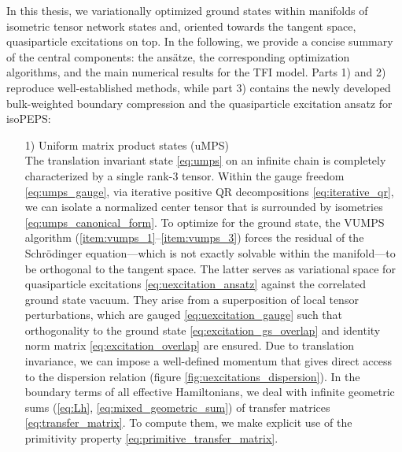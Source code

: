 In this thesis, we variationally optimized ground states within manifolds of isometric tensor network states and, oriented towards the tangent space, quasiparticle excitations on top. In the following, we provide a concise summary of the central components: the ansätze, the corresponding optimization algorithms, and the main numerical results for the TFI model. Parts 1) and 2) reproduce well-established methods, while part 3) contains the newly developed bulk-weighted boundary compression and the quasiparticle excitation ansatz for isoPEPS:
\begin{enumerate}
	\item[1)] Uniform matrix product states (uMPS) \\[0.3em]
	The translation invariant state \eqref{eq:umps} on an infinite chain is completely characterized by a single rank-3 tensor. Within the gauge freedom \eqref{eq:umps_gauge}, via iterative positive QR decompositions \eqref{eq:iterative_qr}, we can isolate a normalized center tensor that is surrounded by isometries \eqref{eq:umps_canonical_form}. To optimize for the ground state, the VUMPS algorithm (\ref{item:vumps_1}--\ref{item:vumps_3}) forces the residual of the Schrödinger equation---which is not exactly solvable within the manifold---to be orthogonal to the tangent space. The latter serves as variational space for quasiparticle excitations \eqref{eq:uexcitation_ansatz} against the correlated ground state vacuum. They arise from a superposition of local tensor perturbations, which are gauged \eqref{eq:uexcitation_gauge} such that orthogonality to the ground state \eqref{eq:excitation_gs_overlap} and identity norm matrix \eqref{eq:excitation_overlap} are ensured. Due to translation invariance, we can impose a well-defined momentum that gives direct access to the dispersion relation (figure \ref{fig:uexcitations_dispersion}). In the boundary terms of all effective Hamiltonians, we deal with infinite geometric sums (\ref{eq:Lh}, \ref{eq:mixed_geometric_sum}) of transfer matrices \eqref{eq:transfer_matrix}. To compute them, we make explicit use of the primitivity property \eqref{eq:primitive_transfer_matrix}.
	

\end{enumerate}
